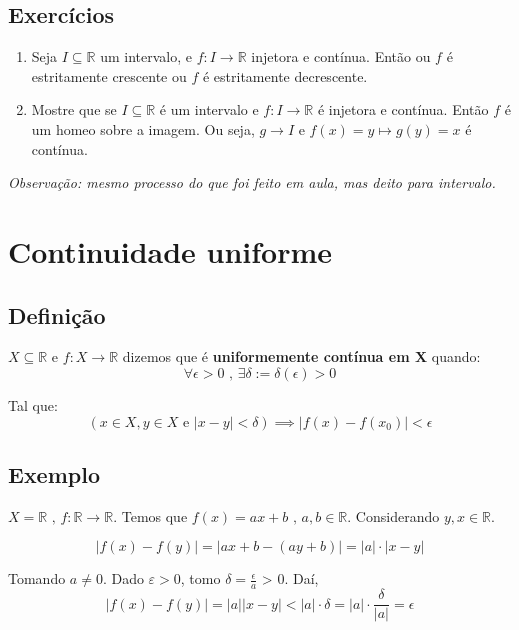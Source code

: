 \documentclass[12pt]{article}
\begin{document}
\subsection*{Exercícios}
\begin{enumerate}
    \item Seja $I \subseteq \mathbb{R}$ um intervalo, e $f: I \to \mathbb{R}$ injetora e contínua. Então ou $f$ é estritamente crescente ou $f$ é estritamente decrescente.

    \item Mostre que se $I \subseteq \mathbb{R}$ é um intervalo e $f: I \to \mathbb{R}$ é injetora e contínua. Então $f$ é um homeo sobre a imagem. Ou seja, $g \to I$ e $f(x) = y \mapsto g(y)=x$ é contínua.

    \end{enumerate}
    \textit{Observação: mesmo processo do que foi feito em aula, mas deito para intervalo.}

    \section*{Continuidade uniforme}
    \subsection*{Definição}
    $X \subseteq \mathbb{R}$ e $f: X \to \mathbb{R}$ dizemos que é \textbf{uniformemente contínua em X} quando:
    \begin{equation*}
        \forall \epsilon > 0 \text{ , } \exists \delta := \delta(\epsilon) > 0 
    \end{equation*}

    Tal que:
    \begin{equation*}
        \left( x \in X, y \in X \text{ e } |x-y|< \delta \right) \implies |f(x) - f(x_0)| < \epsilon
    \end{equation*}

    \subsection*{Exemplo}
    $X = \mathbb{R} \text{ , } f: \mathbb{R} \to \mathbb{R}$. Temos que $f(x) = ax + b \text{ , } a,b \in \mathbb{R}$. Considerando $y, x \in \mathbb{R}$.

    \begin{equation*}
        |f(x) - f(y)| = |ax+b - (ay+b)| = |a| \cdot |x-y|
    \end{equation*}

    Tomando $a \neq 0$. Dado $\varepsilon > 0 $, tomo $\delta = \frac{\epsilon}{a}$ > 0. Daí,
    \begin{equation*}
        |f(x) - f(y)| = |a||x - y| < |a| \cdot \delta = |a|\cdot \frac{\delta}{|a|} = \epsilon
    \end{equation*}
\end{document}
